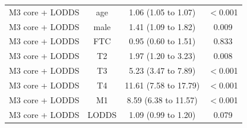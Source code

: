 \begin{table}[htbp]
\begin{tabular*}{\textwidth}{@{\extracolsep{\fill}}lccc@{}}
M3 core + LODDS & age & 1.06 (1.05 to 1.07) & $<$0.001 \\
M3 core + LODDS & male & 1.41 (1.09 to 1.82) & 0.009 \\
M3 core + LODDS & FTC & 0.95 (0.60 to 1.51) & 0.833 \\
M3 core + LODDS & T2 & 1.97 (1.20 to 3.23) & 0.008 \\
M3 core + LODDS & T3 & 5.23 (3.47 to 7.89) & $<$0.001 \\
M3 core + LODDS & T4 & 11.61 (7.58 to 17.79) & $<$0.001 \\
M3 core + LODDS & M1 & 8.59 (6.38 to 11.57) & $<$0.001 \\
M3 core + LODDS & LODDS & 1.09 (0.99 to 1.20) & 0.079 \\
\bottomrule
\end{tabular*}
\smallskip{}
\end{table}
